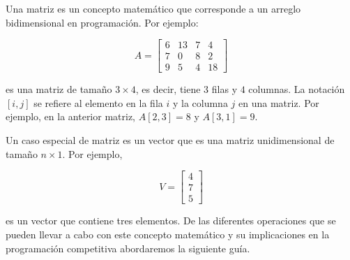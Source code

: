 Una matriz es un concepto matemático que corresponde a un arreglo bidimensional en programación. Por ejemplo:

$$
  A = \begin{bmatrix}
  6	& 13 & 7 & 4 \\
  7	& 0 & 8 & 2 \\
  9	& 5 & 4 & 18
\end{bmatrix}$$

es una matriz de tamaño $3 \times 4$, es decir, tiene $3$ filas y $4$ columnas. La notación $[i, j]$ se refiere al elemento en la fila $i$ y la columna $j$ en una matriz. Por ejemplo, en la anterior matriz, $A [2, 3] = 8$ y $A [3, 1] = 9$.

Un caso especial de matriz es un vector que es una matriz unidimensional de tamaño $n \times 1$. Por ejemplo,

$$
V = \begin{bmatrix}
	4 \\
	7 \\
	5
\end{bmatrix}$$

es un vector que contiene tres elementos. De las diferentes operaciones que se pueden llevar a cabo con este concepto matemático y su implicaciones en la programación competitiva abordaremos la siguiente guía.